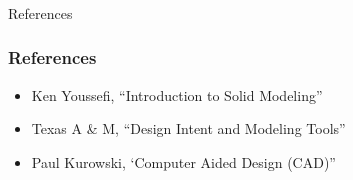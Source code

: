 \begin{frame}[fragile]\frametitle{}
\begin{center}
{\Large References}
\end{center}
\end{frame}


\begin{frame}[fragile]\frametitle{References}

\begin{itemize}
\item Ken Youssefi, “Introduction to Solid Modeling”
\item Texas A \& M, “Design Intent and Modeling Tools”
\item Paul Kurowski, ‘Computer Aided Design (CAD)”
\end{itemize}
\end{frame}